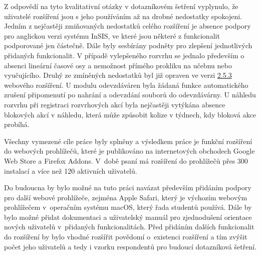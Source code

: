 Z odpovědí na tyto kvalitativní otázky v dotazníkovém šetření vyplynulo, že uživatelé rozšíření jsou s jeho používáním až na drobné nedostatky spokojeni. Jedním z nejčastěji zmiňovaných nedostatků celého rozšíření je absence podpory pro anglickou verzi systému InSIS, ve které jsou některé z funkcionalit podporované jen částečně. Dále byly sesbírány podněty pro zlepšení jednotlivých přidaných funkcionalit. V případě vylepšeného rozvrhu se jednalo především o absenci lineární časové osy a nemožnost přímého prokliku na učebnu nebo vyučujícího. Druhý ze zmíněných nedostatků byl již opraven ve verzi \href{https://gitlab.com/vse-plus/extension/-/releases/v2.5.3}{2.5.3} webového rozšíření. U modulu odevzdáváren byla žádaná funkce automatického zrušení připomenutí po nahrání a odevzdání souborů do odevzdávárny. U náhledu rozvrhu při registraci rozvrhových akcí byla nejčastěji vytýkána absence blokových akcí v náhledu, která může způsobit kolize v týdnech, kdy bloková akce probíhá.

Všechny vymezené cíle práce byly splněny a výsledkem práce je funkční rozšíření do webových prohlížečů, které je publikováno na internetových obchodech Google Web Store a Firefox Addons. V~době psaní má rozšíření do prohlížečů přes 300 instalací a více než 120 aktivních uživatelů. 

\clearpage
Do budoucna by bylo možné na tuto práci navázat především přidáním podpory pro další webové prohlížeče, zejména Apple Safari, který je výchozím webovým prohlížečem v~operačním systému macOS, který řada studentů používá. Dále by bylo možné přidat dokumentaci a uživatelský manuál pro zjednodušení orientace nových uživatelů v~přidaných funkcionalitách. Před přidáním dalších funkcionalit do rozšíření by bylo vhodné rozšířit povědomí o~existenci rozšíření a tím zvýšit počet jeho uživatelů a tedy i vzorku respondentů pro budoucí dotazníková šetření. 

